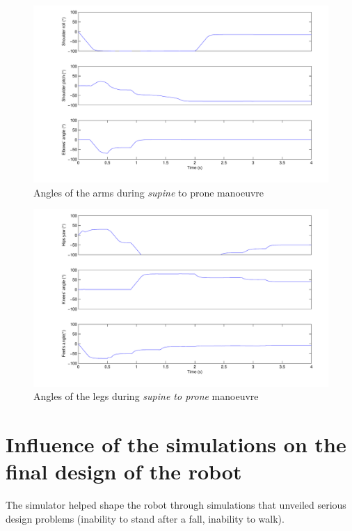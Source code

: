 \begin{figure}[htp]
\center
    \includegraphics[width = \textwidth]{figures/prone2standArms}
    \caption[Angles of the arms during \emph{supine} to prone manoeuvre]{Angles of the arms during \emph{supine} to prone manoeuvre}
    \label{fig:prone2standArms}
\end{figure}

\begin{figure}[htp]
\center
    \includegraphics[width = \textwidth]{figures/prone2standLegs}
    \caption[Angles of the legs during \emph{supine to prone} manoeuvre]{Angles of the legs during \emph{supine to prone} manoeuvre}
    \label{fig:prone2standLegs}
\end{figure}

\section{Influence of the simulations on the final design of the robot}
The simulator helped shape the robot through simulations that unveiled serious design problems (inability to stand after a fall, inability to walk).

